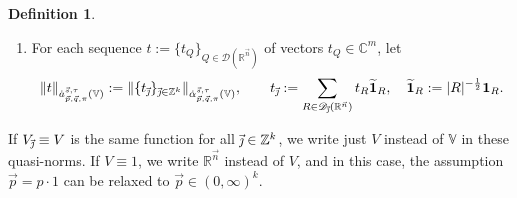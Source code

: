 \documentclass[11pt, reqno]{amsart}
\theoremstyle{definition}
\newtheorem{definition}[theorem]{Definition}
\theoremstyle{remark}
\numberwithin{equation}{section}
\newcommand{\C}{\mathbb C}
\newcommand{\D}{\mathscr D}
\newcommand{\R}{\mathbb R}
\newcommand{\V}{\mathbb V}
\newcommand{\Z}{\mathbb Z}
\newcommand{\vj}{\vec{\textit{\j}}}
\newcommand{\vn}{\vec n}
\newcommand{\vp}{\vec p}
\newcommand{\vq}{\vec q}
\newcommand{\vs}{\vec s}
\newcommand{\atau}{\dot a^{\vs,\tau}_{\vp,\vq,\pi}}
\newcommand{\aatau}{\dot{\alpha}^{\vs,\tau}_{\vp,\vq,\pi}}
\newcommand{\one}{\mathbf{1}}
\newcommand{\abs}[1]{|#1|}
\newcommand{\Norm}[2]{\|#1\|_{#2}}
\begin{document}
\begin{definition}
\begin{enumerate}[\rm(i)]
\item For each sequence $t:=\{t_Q\}_{Q\in\D(\R^{\vn})}$ of vectors $t_Q\in\C^m$, let
\begin{equation}\label{tj}
\Norm{t}{\atau(\mathbb V)} :=\Norm{\{t_{\vj}\}_{\vj\in\mathbb Z^k}}{\aatau(\V)},
\qquad t_{\vj}:=\sum_{R\in\D_{\vj}(\R^{\vec n})}{t}_R\widetilde{\one}_R,
\quad\widetilde{\one}_R:=\abs{R}^{-\frac 12}\one_R.
\end{equation}
\end{enumerate}
If $V_{\vj}\equiv V$ is the same function for all $\vj\in\Z^k$, we write just $V$ instead of $\V$ in these quasi-norms.
If $V\equiv 1$, we write $\R^{\vn}$ instead of $V$,
and in this case, the assumption $\vec p=p\cdot1$ can be relaxed to $\vec p\in(0,\infty)^k$.
\end{definition}
\end{document}
